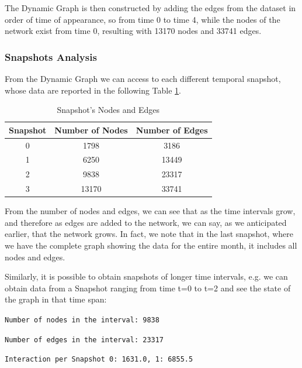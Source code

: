 \documentclass[sigchi]{acmart}
\begin{document}
The Dynamic Graph is then constructed by adding the edges from the dataset in order of time of appearance, so from time 0 to time 4, while the nodes of the network exist from time 0, resulting with 13170 nodes and 33741 edges.

\subsubsection{Snapshots Analysis} From the Dynamic Graph we can access to each different temporal snapshot, whose data are reported in the following Table \ref{tab:Snapshots Nodes and Edges}.


\begin{table}[htbp]
\centering
\caption{Snapshot's Nodes and Edges}
\label{tab:Snapshots Nodes and Edges}
\begin{tabular}{|c|c|c|}
\hline
\centering
    Snapshot & Number of Nodes & Number of Edges \\
    \hline
    0 & 1798 & 3186 \\
    1 & 6250 & 13449 \\
    2 & 9838 & 23317 \\
    3 & 13170 & 33741 \\
\hline
\end{tabular}
\end{table}

\vspace{1pt} %
From the number of nodes and edges, we can see that as the time intervals grow, and therefore as edges are added to the network, we can say, as we anticipated earlier, that the network grows. In fact, we note that in the last snapshot, where we have the complete graph showing the data for the entire month, it includes all nodes and edges.


\noindent Similarly, it is possible to obtain snapshots of longer time intervals, e.g. we can obtain data from a Snapshot ranging from time t=0 to t=2 and see the state of the graph in that time span:

\vspace{5pt}

\noindent \texttt{Number of nodes in the interval: 9838}

\noindent \texttt{Number of edges in the interval: 23317}

\noindent \texttt{Interaction per Snapshot {0: 1631.0, 1: 6855.5}}

\vspace{5pt}
\end{document}
